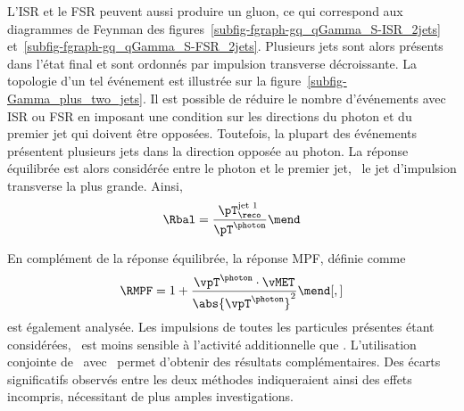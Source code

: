 \par L'ISR et le FSR peuvent aussi produire un gluon, ce qui correspond aux diagrammes de Feynman des figures~\ref{subfig-fgraph-gq_qGamma_S-ISR_2jets} et~\ref{subfig-fgraph-gq_qGamma_S-FSR_2jets}.
Plusieurs jets sont alors présents dans l'état final et sont ordonnés par impulsion transverse décroissante.
La topologie d'un tel événement est illustrée sur la figure~\ref{subfig-Gamma_plus_two_jets}.
Il est possible de réduire le nombre d'événements avec ISR ou FSR en imposant une condition sur les directions du photon et du premier jet qui doivent être opposées.
Toutefois, la plupart des événements présentent plusieurs jets dans la direction opposée au photon.
La réponse équilibrée est alors considérée entre le photon et le premier jet, \ie\ le jet d'impulsion transverse la plus grande. Ainsi,
\begin{equation}
\Rbal = \frac{\pT_\reco^\text{jet 1}}{\pT^{\photon}}
\mend
\end{equation}
\par En complément de la réponse équilibrée, la réponse MPF, définie comme
\begin{equation}
\RMPF = 1 + \frac{\vpT^{\photon}\cdot\vMET}{\abs{\vpT^{\photon}}^2}
\mend[,]
\end{equation}
est également analysée.
Les impulsions de toutes les particules présentes étant considérées, \RMPF\ est moins sensible à l'activité additionnelle que \Rbal.
L'utilisation conjointe de \RMPF\ avec \Rbal\ permet d'obtenir des résultats complémentaires.
Des écarts significatifs observés entre les deux méthodes indiqueraient ainsi des effets incompris, nécessitant de plus amples investigations.
